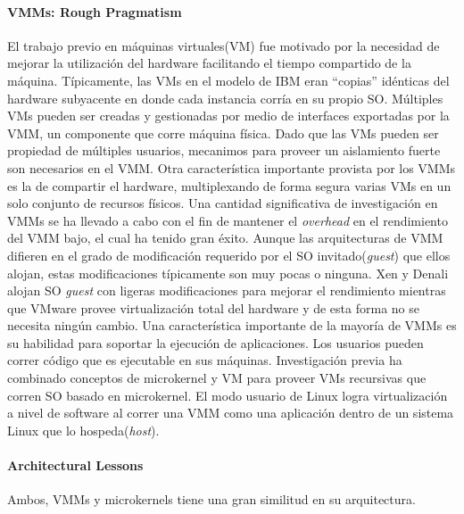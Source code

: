 \paragraph{\textnormal{\textbf{VMMs: Rough Pragmatism}}}
El trabajo previo en máquinas virtuales(VM) fue motivado por la necesidad de mejorar la utilización del hardware facilitando el tiempo compartido de la máquina. Típicamente, las VMs en el modelo de IBM eran ``copias'' idénticas del hardware subyacente en donde cada instancia corría en su propio SO. Múltiples VMs pueden ser creadas y gestionadas por medio de interfaces exportadas por la VMM, un componente que corre máquina física. Dado que las VMs pueden ser propiedad de múltiples usuarios, mecanimos para proveer un aislamiento fuerte son necesarios en el VMM. Otra característica importante provista por los VMMs es la de compartir el hardware, multiplexando de forma segura varias VMs en un solo conjunto de recursos físicos. Una cantidad significativa de investigación en VMMs se ha llevado a cabo con el fin de mantener el \emph{overhead} en el rendimiento del VMM bajo, el cual ha tenido gran éxito. Aunque las arquitecturas de VMM difieren en el grado de modificación requerido por el SO invitado(\emph{guest}) que ellos alojan, estas modificaciones típicamente son muy pocas o ninguna. Xen y Denali alojan SO \emph{guest} con ligeras modificaciones para mejorar el rendimiento mientras que VMware provee virtualización total del hardware y de esta forma no se necesita ningún cambio. Una característica importante de la mayoría de VMMs es su habilidad para soportar la ejecución de aplicaciones. Los usuarios pueden correr código que es ejecutable en sus máquinas. Investigación previa ha combinado conceptos de microkernel y VM para proveer VMs recursivas que corren SO basado en microkernel. El modo usuario de Linux logra virtualización a nivel de software al correr una VMM como una aplicación dentro de un sistema Linux que lo hospeda(\emph{host}).

\paragraph{\textnormal{\textbf{Architectural Lessons}}}
Ambos, VMMs y microkernels tiene una gran similitud en su arquitectura. 


